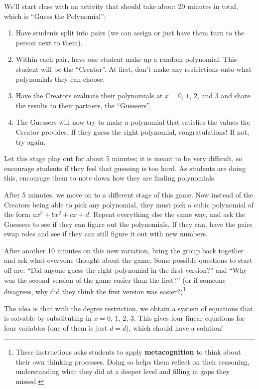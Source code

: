 We'll start class with an activity that should take about 20 minutes in total, which is ``Guess the Polynomial'':
\begin{enumerate}
    \item Have students split into pairs (we can assign or just have them turn to the person next to them).
    \item Within each pair, have one student make up a random polynomial. This student will be the ``Creator''. At first, don't make any restrictions onto what polynomials they can choose.
    \item Have the Creators evaluate their polynomials at $x = 0$, $1$, $2$, and $3$ and share the results to their partners, the ``Guessers''. 
    \item The Guessers will now try to make a polynomial that satisfies the values the Creator provides. If they guess the right polynomial, congratulations! If not, try again.
\end{enumerate}

Let this stage play out for about 5 minutes; it is meant to be very difficult, so encourage students if they feel that guessing is too hard. As students are doing this, encourage them to note down how they are finding polynomials.

After 5 minutes, we move on to a different stage of this game. Now instead of the Creators being able to pick any polynomial, they must pick a cubic polynomial of the form $ax^3+bx^2+cx+d$. Repeat everything else the same way, and ask the Guessers to see if they can figure out the polynomials. If they can, have the pairs swap roles and see if they can still figure it out with new numbers.

After another 10 minutes on this new variation, bring the group back together and ask what everyone thought about the game. Some possible questions to start off are: ``Did anyone guess the right polynomial in the first version?'' and ``Why was the second version of the game easier than the first?'' (or if someone disagrees, why did they think the first version was easier?)\footnote{These instructions asks students to apply \textbf{metacognition} to think about their own thinking processes. Doing so helps them reflect on their reasoning, understanding what they did at a deeper level and filling in gaps they missed.}

The idea is that with the degree restriction, we obtain a system of equations that is solvable by substituting in $x=0$, $1$, $2$, $3$. This gives four linear equations for four variables (one of them is just $d = d$), which should have a solution!


